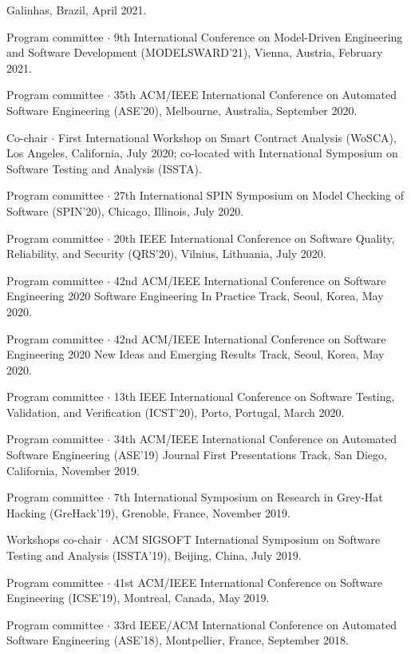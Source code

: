 \documentclass[ComputerScience]{vita}
\begin{document}
\begin{vita}
\begin{Panel and Committee Service}
  Galinhas, Brazil, April 2021.
\item Program committee $\cdot$ 9th International Conference on 
  Model-Driven Engineering and Software Development (MODELSWARD'21), Vienna, Austria, 
  February 2021.   
\item Program committee $\cdot$ 35th ACM/IEEE International Conference 
  on Automated Software Engineering (ASE'20), Melbourne, Australia, 
  September 2020.
\item Co-chair $\cdot$ First International Workshop on Smart Contract 
  Analysis (WoSCA), Los Angeles, California, July 2020; co-located with 
  International Symposium on Software Testing and Analysis (ISSTA).
\item Program committee $\cdot$ 27th International SPIN Symposium on
  Model Checking of Software (SPIN'20), Chicago, Illinois,
  July 2020.
  \item Program committee $\cdot$ 20th IEEE International Conference 
    on Software Quality, Reliability, and Security (QRS'20), Vilnius, 
    Lithuania, July 2020. 
  \item Program committee $\cdot$ 42nd ACM/IEEE International Conference on 
  Software Engineering 2020 Software Engineering In Practice Track, 
  Seoul, Korea, May 2020.
\item Program committee $\cdot$ 42nd ACM/IEEE International Conference on 
  Software Engineering 2020 New Ideas and Emerging Results Track, 
  Seoul, Korea, May 2020.
\item Program committee $\cdot$ 13th IEEE International Conference on
  Software Testing, Validation, and Verification (ICST'20), Porto,
  Portugal, March 2020.
\item Program committee $\cdot$ 34th ACM/IEEE International Conference on Automated Software Engineering (ASE'19) Journal First Presentations Track, San Diego, California, November 2019.
\item Program committee $\cdot$ 7th International Symposium on
  Research in Grey-Hat Hacking (GreHack'19), Grenoble, France, 
  November 2019. 
\item Workshops co-chair $\cdot$ ACM SIGSOFT International Symposium on Software Testing and Analysis (ISSTA'19), Beijing, China, July 2019.
\item Program committee $\cdot$ 41st ACM/IEEE International Conference on Software Engineering (ICSE'19), Montreal, Canada, May 2019. 
\item Program committee $\cdot$ 33rd IEEE/ACM International Conference on Automated Software Engineering (ASE'18), Montpellier, France, September 2018.

\end{Panel and Committee Service}
\end{vita}
\end{document}
